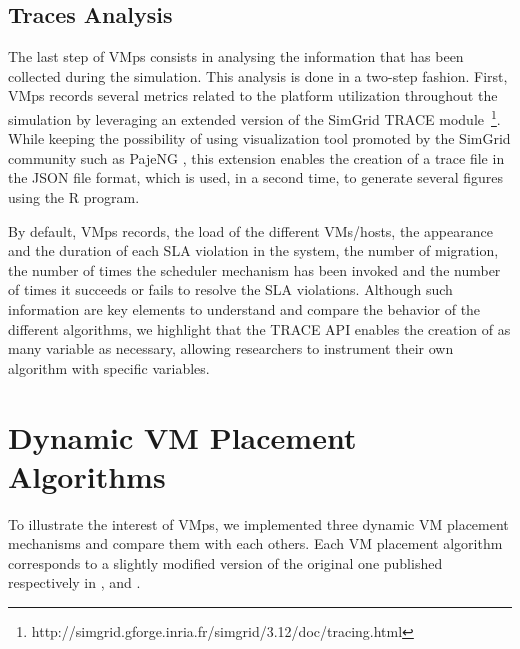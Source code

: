 \documentclass[conference]{IEEEtran}
\newcommand{\sg}{SimGrid\xspace}
\newcommand{\vmps}{VMps\xspace}
\begin{document}
\subsection{Traces Analysis}
The last step of \vmps consists in analysing the
information that has been collected during the simulation.
This analysis is done in a two-step fashion. First, \vmps records
several metrics related to the platform utilization throughout the
simulation by leveraging an extended version of the \sg TRACE
module~\footnote{http://simgrid.gforge.inria.fr/simgrid/3.12/doc/tracing.html}.
While keeping the possibility of using visualization tool
promoted by the \sg community such as PajeNG \cite{xxxx}, this extension enables the creation of a trace file in the
JSON file format, which is  used, in a second time, to generate several figures
using the R program.

By default,  \vmps records,  the load of the different VMs/hosts, the
appearance and the duration of each SLA violation in the system, the number
of migration, the number of times the scheduler mechanism has been
invoked and the number of times it succeeds or fails to resolve the
SLA violations.
%
Although such information are key elements to understand and
compare the behavior of the different algorithms, we highlight that
the TRACE API enables the creation of as many variable as necessary,
allowing researchers to instrument their own algorithm with specific
variables.

\section{Dynamic VM Placement Algorithms}
\label{sec:vm-schedulers}
To illustrate the interest of \vmps, we implemented three dynamic VM
placement mechanisms and compare them with each others. Each VM
placement algorithm corresponds to a slightly modified version of the
original one published respectively in
\cite{Hermenier:2009:ECM:1508293.1508300}, \cite{feller:ccgrid12} and
\cite{quesnel:cpe2012}.
\end{document}
